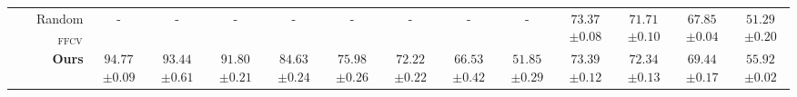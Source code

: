 \begin{table*}[tb]
{\begin{tabular}{crcccccccccccc}
    &Random$_{\mathrm{FFCV}}$ & - & - & - & - & - & - & - &- & \makecell[tl]{$ 73.37$\\ \tiny{\textcolor{denim}{$\pm 0.08$}}} & \makecell[tl]{$ 71.71$\\ \tiny{\textcolor{denim}{$\pm 0.10$}}} & \makecell[tl]{$ 67.85$\\ \tiny{\textcolor{denim}{$\pm 0.04$}}} & \makecell[tl]{$51.29$\\ \tiny{\textcolor{denim}{$\pm 0.20$}}} \\
    \cmidrule(ll){2-14}
&\textbf{Ours}  
& \makecell[tl]{$\mathbf{94.77}$\\ \tiny{\textcolor{denim}{$\pm 0.09$}}} 
& \makecell[tl]{$\mathbf{93.44}$\\ \tiny{\textcolor{denim}{$\pm 0.61$}}} 
& \makecell[tl]{$\mathbf{91.80}$\\ \tiny{\textcolor{denim}{$\pm 0.21$}}} 
& \makecell[tl]{$\mathbf{84.63}$\\ \tiny{\textcolor{denim}{$\pm 0.24$}}} 
& \makecell[tl]{$\mathbf{75.98}$\\ \tiny{\textcolor{denim}{$\pm 0.26$}}} 
& \makecell[tl]{$\mathbf{72.22}$\\ \tiny{\textcolor{denim}{$\pm 0.22$}}} 
& \makecell[tl]{$\mathbf{66.53}$\\ \tiny{\textcolor{denim}{$\pm 0.42$}}} 
& \makecell[tl]{$\mathbf{51.85}$\\ \tiny{\textcolor{denim}{$\pm 0.29$}}} 
& \makecell[tl]{$\mathbf{73.39}$\\ \tiny{\textcolor{denim}{$\pm 0.12$}}} 
& \makecell[tl]{$\mathbf{72.34}$\\ \tiny{\textcolor{denim}{$\pm 0.13$}}} 
& \makecell[tl]{$\mathbf{69.44}$\\ \tiny{\textcolor{denim}{$\pm 0.17$}}} 
& \makecell[tl]{$\mathbf{55.92}$\\ \tiny{\textcolor{denim}{$\pm 0.02$}}}\\
    \bottomrule[1.25pt]
    \end{tabular}
    }
    \vspace{-0.2cm}
\end{table*}